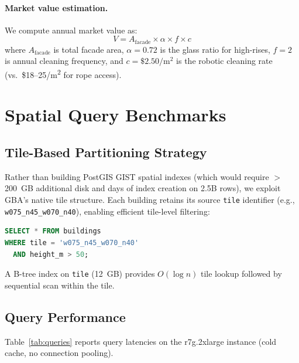 \documentclass[10pt,twocolumn]{article}
\begin{document}
\paragraph{Market value estimation.} We compute annual market value as:
\begin{equation}
  V = A_{\text{facade}} \times \alpha \times f \times c
  \label{eq:market}
\end{equation}
where $A_{\text{facade}}$ is total facade area, $\alpha = 0.72$ is the glass ratio for high-rises, $f = 2$ is annual cleaning frequency, and $c = \$2.50/\text{m}^2$ is the robotic cleaning rate (vs.\ \$18--25/m\textsuperscript{2} for rope access).

\section{Spatial Query Benchmarks}
\label{sec:queries}

\subsection{Tile-Based Partitioning Strategy}

Rather than building PostGIS GIST spatial indexes (which would require $>$200~GB additional disk and days of index creation on 2.5B rows), we exploit GBA's native tile structure. Each building retains its source \texttt{tile} identifier (e.g., \texttt{w075\_n45\_w070\_n40}), enabling efficient tile-level filtering:

\begin{lstlisting}[language=SQL]
SELECT * FROM buildings
WHERE tile = 'w075_n45_w070_n40'
  AND height_m > 50;
\end{lstlisting}

A B-tree index on \texttt{tile} (12~GB) provides $O(\log n)$ tile lookup followed by sequential scan within the tile.

\subsection{Query Performance}

Table~\ref{tab:queries} reports query latencies on the r7g.2xlarge instance (cold cache, no connection pooling).
\end{document}
